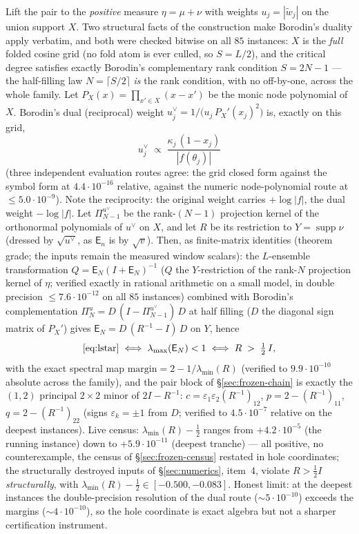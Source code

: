 \documentclass[11pt]{article}
\theoremstyle{remark}
\newcommand{\E}{\mathsf{E}}
\begin{document}
Lift the pair to the \emph{positive} measure $\eta=\mu+\nu$ with
weights $u_{j}=|\widetilde w_{j}|$ on the union support $X$.  Two
structural facts of the construction make Borodin's duality apply
verbatim, and both were checked bitwise on all $85$ instances:
$X$ is the \emph{full} folded cosine grid (no fold atom is ever
culled, so $S=L/2$), and the critical degree satisfies exactly
Borodin's complementary rank condition $S=2N-1$ --- the
half-filling law $N=\lceil S/2\rceil$ \emph{is} the rank condition,
with no off-by-one, across the whole family.  Let
$P_{X}(x)=\prod_{x'\in X}(x-x')$ be the monic node polynomial of
$X$.  Borodin's dual (reciprocal) weight
$u^{\vee}_{j}=1/\bigl(u_{j}\,P_{X}'(x_{j})^{2}\bigr)$ is, exactly
on this grid,
\[
u^{\vee}_{j}\;\propto\;\frac{\kappa_{j}\,(1-x_{j})}
{|f(\theta_{j})|}
\]
(three independent evaluation routes agree: the grid closed form
against the symbol form at $4.4\cdot10^{-16}$ relative, against the
numeric node-polynomial route at $\le 5.0\cdot10^{-9}$).  Note the
reciprocity: the original weight carries $+\log|f|$, the dual
weight $-\log|f|$.  Let $\Pi_{N-1}^{u^{\vee}}$ be the rank-$(N-1)$
projection kernel of the orthonormal polynomials of $u^{\vee}$ on
$X$, and let $R$ be its restriction to $Y=\operatorname{supp}\nu$
(dressed by $\sqrt{u^{\vee}}$, as $\E_{n}$ is by $\sqrt{v}$).
Then, as finite-matrix identities (theorem grade; the inputs remain
the measured window scalars): the $L$-ensemble transformation
$Q=\E_{N}(I+\E_{N})^{-1}$ ($Q$ the $Y$-restriction of the rank-$N$
projection kernel of $\eta$; verified exactly in rational
arithmetic on a small model, in double precision
$\le 7.6\cdot10^{-12}$ on all $85$ instances) combined with
Borodin's complementation
$\Pi_{N}^{u}=D\,(I-\Pi_{N-1}^{u^{\vee}})\,D$ at half filling
($D$ the diagonal sign matrix of $P_{X}'$) gives
$\E_{N}=D\,(R^{-1}-I)\,D$ on $Y$, hence
\[
\eqref{eq:lstar}
\iff
\lambda_{\max}(\E_{N})<1
\iff
R\;>\;\tfrac12\,I ,
\]
with the exact spectral map
$\mathrm{margin}=2-1/\lambda_{\min}(R)$ (verified to
$9.9\cdot10^{-10}$ absolute across the family), and the pair block
of \S\ref{sec:frozen-chain} is exactly the $(1,2)$ principal
$2\times2$ minor of $2I-R^{-1}$:
$c=\varepsilon_{1}\varepsilon_{2}(R^{-1})_{12}$,
$p=2-(R^{-1})_{11}$, $q=2-(R^{-1})_{22}$ (signs
$\varepsilon_{k}=\pm1$ from $D$; verified to $4.5\cdot10^{-7}$
relative on the deepest instances).  Live census: $\lambda_{\min}
(R)-\tfrac12$ ranges from $+4.2\cdot10^{-5}$ (the running instance)
down to $+5.9\cdot10^{-11}$ (deepest tranche) --- all positive, no
counterexample, the census of \S\ref{sec:frozen-census} restated in
hole coordinates; the structurally destroyed inputs of
\S\ref{sec:numerics}, item~4, violate $R>\tfrac12 I$
\emph{structurally}, with $\lambda_{\min}(R)-\tfrac12\in
[-0.500,-0.083]$.  Honest limit: at the deepest instances the
double-precision resolution of the dual route ($\sim5\cdot10^{-10}$)
exceeds the margins ($\sim4\cdot10^{-10}$), so the hole coordinate
is exact algebra but not a sharper certification instrument.
\end{document}
